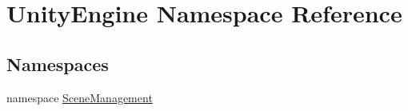 \hypertarget{namespace_unity_engine}{}\section{Unity\+Engine Namespace Reference}
\label{namespace_unity_engine}
\subsection*{Namespaces}
\begin{DoxyCompactItemize}
\item 
namespace \hyperlink{namespace_unity_engine_1_1_scene_management}{Scene\+Management}
\end{DoxyCompactItemize}
